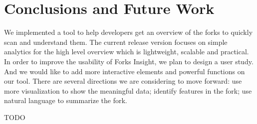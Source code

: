 \section{Conclusions and Future Work}
We implemented a tool to help developers get an overview of the forks to quickly scan and understand them. The current release version focuses on simple analytics for the high level overview which is lightweight, scalable and practical. In order to improve the usability of Forks Insight, we plan to design a user study. And we would like to add more interactive elements and powerful functions on our tool. There are several directions we are considering to move forward: use more visualization to show the meaningful data; identify features in the fork; use natural language to summarize the fork.

\begin{acks}
  TODO
\end{acks}


